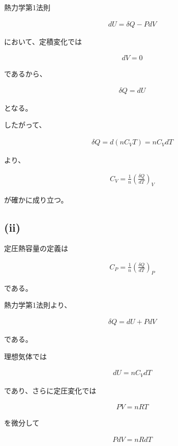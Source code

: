 \documentclass[platex,dvipdfmx,a4paper]{jsarticle}
\begin{document}
熱力学第1法則

\begin{align*}
dU=\delta Q-PdV
\end{align*}

において、定積変化では

\begin{align*}
dV=0
\end{align*}

であるから、

\begin{align*}
\delta Q=dU
\end{align*}

となる。

したがって、

\begin{align*}
\delta Q
=
d(nC_VT)
=
nC_VdT
\end{align*}

より、

\begin{align*}
C_V
=
\frac{1}{n}
\left(
\frac{\delta Q}{dT}
\right)_V
\end{align*}

が確かに成り立つ。

\subsection{(ii)}

定圧熱容量の定義は

\begin{align*}
C_P
=
\frac{1}{n}
\left(
\frac{\delta Q}{dT}
\right)_P
\end{align*}

である。

熱力学第1法則より、

\begin{align*}
\delta Q
=
dU+PdV
\end{align*}

である。

理想気体では

\begin{align*}
dU=nC_VdT
\end{align*}

であり、さらに定圧変化では

\begin{align*}
PV=nRT
\end{align*}

を微分して

\begin{align*}
PdV=nRdT
\end{align*}
\end{document}
